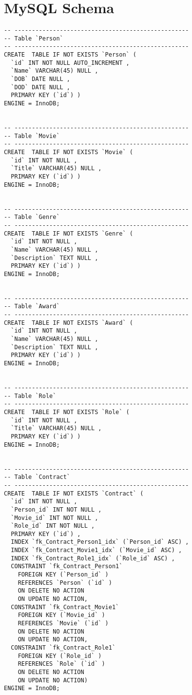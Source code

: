 \section{MySQL Schema}
\begin{lstlisting}[breaklines]
-- --------------------------------------------------
-- Table `Person`
-- --------------------------------------------------
CREATE  TABLE IF NOT EXISTS `Person` (
  `id` INT NOT NULL AUTO_INCREMENT ,
  `Name` VARCHAR(45) NULL ,
  `DOB` DATE NULL ,
  `DOD` DATE NULL ,
  PRIMARY KEY (`id`) )
ENGINE = InnoDB;


-- --------------------------------------------------
-- Table `Movie`
-- --------------------------------------------------
CREATE  TABLE IF NOT EXISTS `Movie` (
  `id` INT NOT NULL ,
  `Title` VARCHAR(45) NULL ,
  PRIMARY KEY (`id`) )
ENGINE = InnoDB;


-- --------------------------------------------------
-- Table `Genre`
-- --------------------------------------------------
CREATE  TABLE IF NOT EXISTS `Genre` (
  `id` INT NOT NULL ,
  `Name` VARCHAR(45) NULL ,
  `Description` TEXT NULL ,
  PRIMARY KEY (`id`) )
ENGINE = InnoDB;


-- --------------------------------------------------
-- Table `Award`
-- --------------------------------------------------
CREATE  TABLE IF NOT EXISTS `Award` (
  `id` INT NOT NULL ,
  `Name` VARCHAR(45) NULL ,
  `Description` TEXT NULL ,
  PRIMARY KEY (`id`) )
ENGINE = InnoDB;


-- --------------------------------------------------
-- Table `Role`
-- --------------------------------------------------
CREATE  TABLE IF NOT EXISTS `Role` (
  `id` INT NOT NULL ,
  `Title` VARCHAR(45) NULL ,
  PRIMARY KEY (`id`) )
ENGINE = InnoDB;


-- --------------------------------------------------
-- Table `Contract`
-- --------------------------------------------------
CREATE  TABLE IF NOT EXISTS `Contract` (
  `id` INT NOT NULL ,
  `Person_id` INT NOT NULL ,
  `Movie_id` INT NOT NULL ,
  `Role_id` INT NOT NULL ,
  PRIMARY KEY (`id`) ,
  INDEX `fk_Contract_Person1_idx` (`Person_id` ASC) ,
  INDEX `fk_Contract_Movie1_idx` (`Movie_id` ASC) ,
  INDEX `fk_Contract_Role1_idx` (`Role_id` ASC) ,
  CONSTRAINT `fk_Contract_Person1`
    FOREIGN KEY (`Person_id` )
    REFERENCES `Person` (`id` )
    ON DELETE NO ACTION
    ON UPDATE NO ACTION,
  CONSTRAINT `fk_Contract_Movie1`
    FOREIGN KEY (`Movie_id` )
    REFERENCES `Movie` (`id` )
    ON DELETE NO ACTION
    ON UPDATE NO ACTION,
  CONSTRAINT `fk_Contract_Role1`
    FOREIGN KEY (`Role_id` )
    REFERENCES `Role` (`id` )
    ON DELETE NO ACTION
    ON UPDATE NO ACTION)
ENGINE = InnoDB;



\end{lstlisting}
